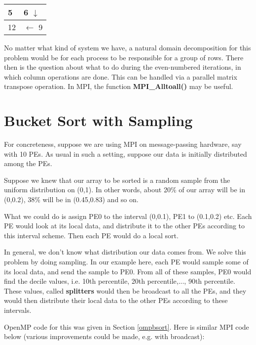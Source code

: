 \begin{tabular}{|l|l|}
\hline
5 & 6 $\downarrow$ \\ \hline 
12 & $\leftarrow$ 9 \\ \hline 
\end{tabular}

No matter what kind of system we have, a natural domain decomposition
for this problem would be for each process to be responsible for a group
of rows.  There then is the question about what to do during the
even-numbered iterations, in which column operations are done.  This can
be handled via a parallel matrix transpose operation.  In MPI, the
function {\bf MPI\_Alltoall()} may be useful.

\section{Bucket Sort with Sampling}
\label{bsort}

For concreteness, suppose we are using MPI on message-passing hardware,
say with 10 PEs.  As usual in such a setting, suppose our data is
initially distributed among the PEs.

Suppose we knew that our array to be sorted is a random sample from the
uniform distribution on (0,1).  In other words, about 20\% of our array
will be in (0,0.2), 38\% will be in (0.45,0.83) and so on.  

What we could do is assign PE0 to the interval (0,0.1), PE1 to (0.1,0.2)
etc.  Each PE would look at its local data, and distribute it to the
other PEs according to this interval scheme.  Then each PE would do a
local sort.

In general, we don't know what distribution our data comes from.  We
solve this problem by doing sampling.  In our example here, each PE
would sample some of its local data, and send the sample to PE0.  From
all of these samples, PE0 would find the decile values, i.e. 10th
percentile, 20th percentile,..., 90th percentile.  These values, called
{\bf splitters} would then be broadcast to all the PEs, and they would
then distribute their local data to the other PEs according to these
intervals.  

OpenMP code for this was given in Section \ref{ompbsort}.  Here is
similar MPI code below (various improvements could be made, e.g. with
broadcast):

